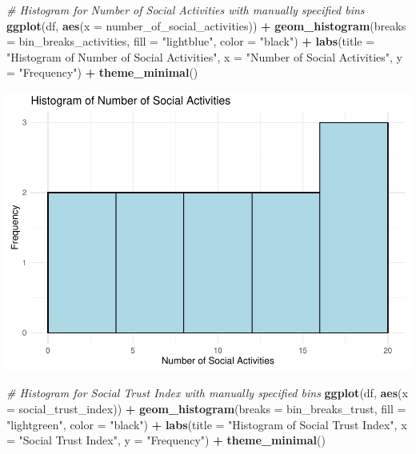 \documentclass[
  11pt,
]{article}
\newenvironment{Shaded}{\begin{snugshade}}{\end{snugshade}}
\newcommand{\AttributeTok}[1]{\textcolor[rgb]{0.13,0.29,0.53}{#1}}
\newcommand{\CommentTok}[1]{\textcolor[rgb]{0.56,0.35,0.01}{\textit{#1}}}
\newcommand{\FunctionTok}[1]{\textcolor[rgb]{0.13,0.29,0.53}{\textbf{#1}}}
\newcommand{\NormalTok}[1]{#1}
\newcommand{\SpecialCharTok}[1]{\textcolor[rgb]{0.81,0.36,0.00}{\textbf{#1}}}
\newcommand{\StringTok}[1]{\textcolor[rgb]{0.31,0.60,0.02}{#1}}
\begin{document}
\begin{Shaded}
\begin{Highlighting}[]
\CommentTok{\# Histogram for Number of Social Activities with manually specified bins}
\FunctionTok{ggplot}\NormalTok{(df, }\FunctionTok{aes}\NormalTok{(}\AttributeTok{x =}\NormalTok{ number\_of\_social\_activities)) }\SpecialCharTok{+} \FunctionTok{geom\_histogram}\NormalTok{(}\AttributeTok{breaks =}\NormalTok{ bin\_breaks\_activities,}
    \AttributeTok{fill =} \StringTok{"lightblue"}\NormalTok{, }\AttributeTok{color =} \StringTok{"black"}\NormalTok{) }\SpecialCharTok{+} \FunctionTok{labs}\NormalTok{(}\AttributeTok{title =} \StringTok{"Histogram of Number of Social Activities"}\NormalTok{,}
    \AttributeTok{x =} \StringTok{"Number of Social Activities"}\NormalTok{, }\AttributeTok{y =} \StringTok{"Frequency"}\NormalTok{) }\SpecialCharTok{+} \FunctionTok{theme\_minimal}\NormalTok{()}
\end{Highlighting}
\end{Shaded}

\includegraphics{Answers-PS1_files/figure-latex/unnamed-chunk-5-1.pdf}

\begin{Shaded}
\begin{Highlighting}[]
\CommentTok{\# Histogram for Social Trust Index with manually specified bins}
\FunctionTok{ggplot}\NormalTok{(df, }\FunctionTok{aes}\NormalTok{(}\AttributeTok{x =}\NormalTok{ social\_trust\_index)) }\SpecialCharTok{+} \FunctionTok{geom\_histogram}\NormalTok{(}\AttributeTok{breaks =}\NormalTok{ bin\_breaks\_trust,}
    \AttributeTok{fill =} \StringTok{"lightgreen"}\NormalTok{, }\AttributeTok{color =} \StringTok{"black"}\NormalTok{) }\SpecialCharTok{+} \FunctionTok{labs}\NormalTok{(}\AttributeTok{title =} \StringTok{"Histogram of Social Trust Index"}\NormalTok{,}
    \AttributeTok{x =} \StringTok{"Social Trust Index"}\NormalTok{, }\AttributeTok{y =} \StringTok{"Frequency"}\NormalTok{) }\SpecialCharTok{+} \FunctionTok{theme\_minimal}\NormalTok{()}
\end{Highlighting}
\end{Shaded}
\end{document}
